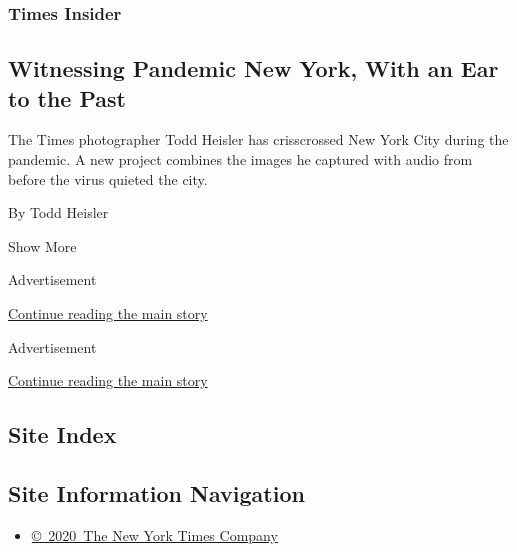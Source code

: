 \begin{enumerate}
  \hypertarget{times-insider-8}{%
  \subsubsection{Times Insider}\label{times-insider-8}}

  \hypertarget{witnessing-pandemic-new-york-with-an-ear-to-the-past}{%
  \subsection{Witnessing Pandemic New York, With an Ear to the
  Past}\label{witnessing-pandemic-new-york-with-an-ear-to-the-past}}

  The Times photographer Todd Heisler has crisscrossed New York City
  during the pandemic. A new project combines the images he captured
  with audio from before the virus quieted the city.

  By Todd Heisler
\end{enumerate}

Show More

Advertisement

\protect\hyperlink{after-mid4}{Continue reading the main story}

Advertisement

\protect\hyperlink{after-mktg}{Continue reading the main story}

\hypertarget{site-index}{%
\subsection{Site Index}\label{site-index}}

\hypertarget{site-information-navigation}{%
\subsection{Site Information
Navigation}\label{site-information-navigation}}

\begin{itemize}
\tightlist
\item
  \href{https://help.nytimes3xbfgragh.onion/hc/en-us/articles/115014792127-Copyright-notice}{©~2020~The
  New York Times Company}
\end{itemize}


